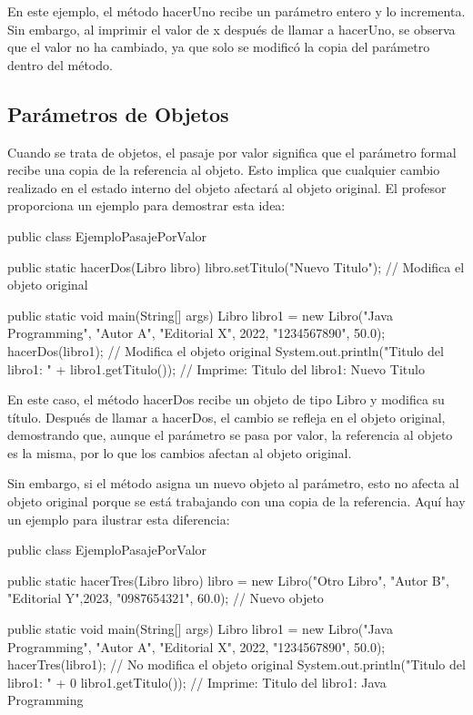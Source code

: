 \documentclass[a4paper]{report}
\begin{document}
En este ejemplo, el método hacerUno recibe un parámetro entero y lo incrementa. Sin embargo, al imprimir el valor de x después de llamar a hacerUno, se observa que el valor no ha cambiado, ya que solo se modificó la copia del parámetro dentro del método.

\subsection{Parámetros de Objetos}
Cuando se trata de objetos, el pasaje por valor significa que el parámetro formal recibe una copia de la referencia al objeto. Esto implica que cualquier cambio realizado en el estado interno del objeto afectará al objeto original. El profesor proporciona un ejemplo para demostrar esta idea:

\begin{roundedlst}
public class EjemploPasajePorValor {
    public static hacerDos(Libro libro) {
        libro.setTitulo("Nuevo Titulo"); 
        // Modifica el objeto original
    }

    public static void main(String[] args) {
        Libro libro1 =  new Libro("Java Programming", 
                        "Autor A", "Editorial X", 2022,
                        "1234567890", 50.0);
        hacerDos(libro1); // Modifica el objeto original
        System.out.println("Titulo del libro1: " +
                           libro1.getTitulo());
        // Imprime: Titulo del libro1: Nuevo Titulo
    }
}

\end{roundedlst}

En este caso, el método hacerDos recibe un objeto de tipo Libro y modifica su título. Después de llamar a hacerDos, el cambio se refleja en el objeto original, demostrando que, aunque el parámetro se pasa por valor, la referencia al objeto es la misma, por lo que los cambios afectan al objeto original.

Sin embargo, si el método asigna un nuevo objeto al parámetro, esto no afecta al objeto original porque se está trabajando con una copia de la referencia. Aquí hay un ejemplo para ilustrar esta diferencia:

\begin{roundedlst}
public class EjemploPasajePorValor {
    public static hacerTres(Libro libro) {
        libro = new Libro("Otro Libro", "Autor B", 
                          "Editorial Y",2023, 
                          "0987654321", 60.0); 
                          // Nuevo objeto
    }

    public static void main(String[] args) {
        Libro libro1 = new Libro("Java Programming", 
                                "Autor A", "Editorial X",
                                 2022, "1234567890", 50.0);
        hacerTres(libro1); 
        // No modifica el objeto original
        System.out.println("Titulo del libro1: " + 0
                           libro1.getTitulo()); 
        // Imprime: Titulo del libro1: Java Programming
    }
}
\end{roundedlst}
\end{document}
